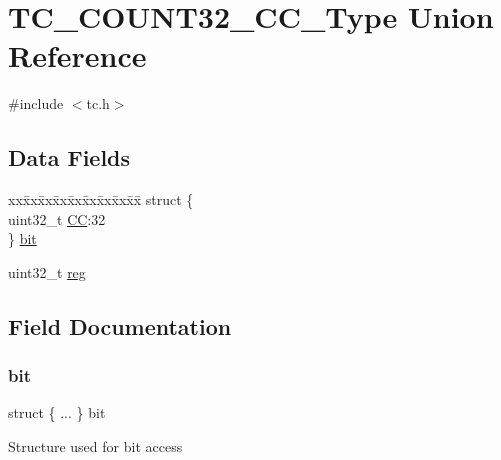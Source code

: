 \hypertarget{union_t_c___c_o_u_n_t32___c_c___type}{}\section{T\+C\+\_\+\+C\+O\+U\+N\+T32\+\_\+\+C\+C\+\_\+\+Type Union Reference}
\label{union_t_c___c_o_u_n_t32___c_c___type}


{\ttfamily \#include $<$tc.\+h$>$}

\subsection*{Data Fields}
\begin{DoxyCompactItemize}
\item 
\begin{tabbing}
xx\=xx\=xx\=xx\=xx\=xx\=xx\=xx\=xx\=\kill
struct \{\\
\>uint32\_t \mbox{\hyperlink{union_t_c___c_o_u_n_t32___c_c___type_a10f2b0518af5a37e14c710d230272d1d}{CC}}:32\\
\} \mbox{\hyperlink{union_t_c___c_o_u_n_t32___c_c___type_a576dc8c8382a42a82aeebb20ec9af84f}{bit}}\\

\end{tabbing}\item 
uint32\+\_\+t \mbox{\hyperlink{union_t_c___c_o_u_n_t32___c_c___type_a6b91636401516a477989a336376d7b40}{reg}}
\end{DoxyCompactItemize}


\subsection{Field Documentation}
\mbox{\label{union_t_c___c_o_u_n_t32___c_c___type_a576dc8c8382a42a82aeebb20ec9af84f}} 
\subsubsection{\texorpdfstring{bit}{bit}}
{\footnotesize\ttfamily struct \{ ... \}   bit}

Structure used for bit access \mbox{\label{union_t_c___c_o_u_n_t32___c_c___type_a10f2b0518af5a37e14c710d230272d1d}} 
